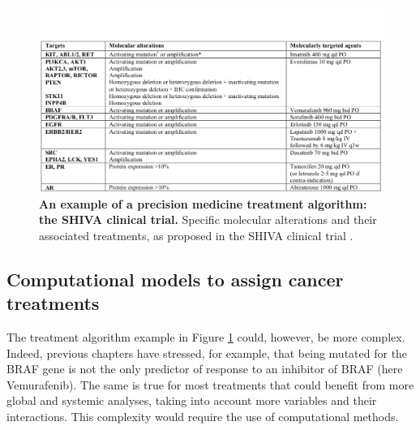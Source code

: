 \documentclass[a4paper,12pt,twoside,onecolumn,openright,final,oldfontcommands]{memoir}
\begin{document}
\begin{figure}

{\centering \includegraphics[width=0.8\linewidth]{fig/SHIVA_algo} 

}

\caption[An example of a precision medicine treatment algorithm: the SHIVA clinical trial]{\textbf{An example of a precision medicine treatment
algorithm: the SHIVA clinical trial.} Specific molecular alterations and
their associated treatments, as proposed in the SHIVA clinical trial
\citep{le2015molecularly}.}\label{fig:SHIVA}
\end{figure}






\subsection{Computational models to assign cancer
treatments}\label{computational-models-to-assign-cancer-treatments}

The treatment algorithm example in Figure \ref{fig:SHIVA} could,
however, be more complex. Indeed, previous chapters have stressed, for
example, that being mutated for the BRAF gene is not the only predictor
of response to an inhibitor of BRAF (here Vemurafenib). The same is true
for most treatments that could benefit from more global and systemic
analyses, taking into account more variables and their interactions.
This complexity would require the use of computational methods.
\end{document}
